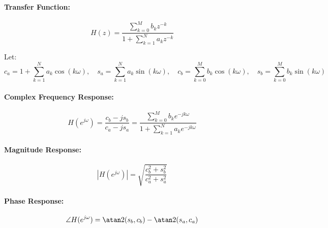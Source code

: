 \paragraph{Transfer Function:}
\begin{equation}
 H(z) = \frac{\sum_{k=0}^M  b_k z^{-k}} {1 + \sum_{k=1}^N a_k z^{-k}}
\end{equation}

Let:
\begin{equation}
 c_a = 1 + \sum_{k=1}^N a_k \cos(k \omega), \quad 
 s_a =     \sum_{k=1}^N a_k \sin(k \omega), \quad
 c_b =     \sum_{k=0}^M b_k \cos(k \omega), \quad
 s_b =     \sum_{k=0}^M b_k \sin(k \omega) 
\end{equation}

\paragraph{Complex Frequency Response:}
\begin{equation}
 H(e^{j \omega}) = \frac{c_b - j s_b}{c_a - j s_a} = \frac{\sum_{k=0}^M  b_k e^{-jk\omega}} {1 + \sum_{k=1}^N a_k e^{-jk\omega}}
\end{equation}

\paragraph{Magnitude Response:}
\begin{equation}
 |H(e^{j \omega})| = \sqrt{ \frac{c_b^2 + s_b^2}{c_a^2 + s_a^2} }
\end{equation}

\paragraph{Phase Response:}
\begin{equation}
 \angle H(e^{j \omega}) = \atan2(s_b, c_b) - \atan2(s_a, c_a)
\end{equation}



